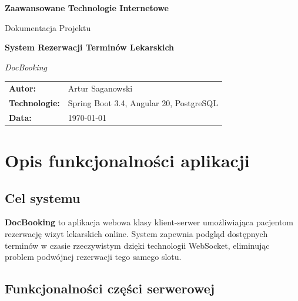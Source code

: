 \documentclass[12pt, a4paper]{article}
\begin{document}
\begin{titlepage}
  \centering
  \vspace*{2cm}
  {\LARGE\bfseries Zaawansowane Technologie Internetowe\par}
  \vspace{0.5cm}
  {\large Dokumentacja Projektu\par}
  \vspace{2cm}
  {\huge\bfseries System Rezerwacji Terminów Lekarskich\par}
  \vspace{1cm}
  {\large \textit{DocBooking}\par}
  \vspace{3cm}
  \begin{tabular}{ll}
    \textbf{Autor:}       & Artur Saganowski \\[4pt]
    \textbf{Technologie:} & Spring Boot 3.4, Angular 20, PostgreSQL \\[4pt]
    \textbf{Data:}        & \today \\
  \end{tabular}
  \vfill
\end{titlepage}

\tableofcontents
\newpage

\section{Opis funkcjonalności aplikacji}

\subsection{Cel systemu}

\textbf{DocBooking} to aplikacja webowa klasy klient-serwer umożliwiająca pacjentom rezerwację wizyt lekarskich online. System zapewnia podgląd dostępnych terminów w czasie rzeczywistym dzięki technologii WebSocket, eliminując problem podwójnej rezerwacji tego samego slotu.

\subsection{Funkcjonalności części serwerowej}
\end{document}
